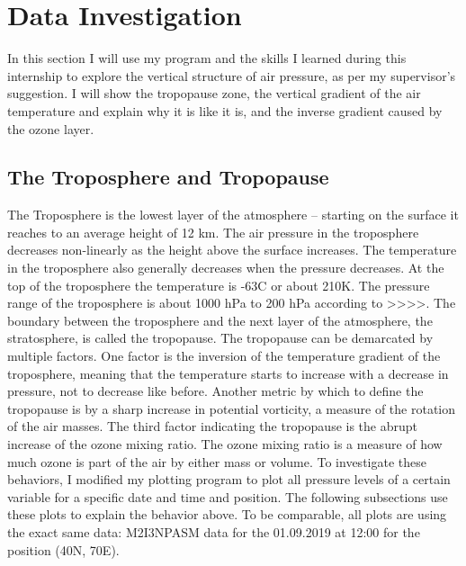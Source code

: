 \documentclass[../00_main.tex]{subfiles}
\begin{document}
\section{Data Investigation}

In this section I will use my program and the skills I learned during this
internship to explore the vertical structure of air pressure, as per my
supervisor's suggestion. I will show the tropopause zone, the vertical gradient
of the air temperature and explain why it is like it is, and the inverse
gradient caused by the ozone layer.

\subsection{The Troposphere and Tropopause}

The Troposphere is the lowest layer of the atmosphere -- starting on the surface
it reaches to an average height of 12 km.
The air pressure in the troposphere decreases non-linearly as the height above 
the surface increases.
The temperature in the troposphere also generally decreases when the pressure
decreases. At the top of the troposphere the temperature is -63\textdegree{}C
or about 210K. 
The pressure range of the troposphere is about 1000 hPa to 200 hPa according to >>>>.\newline
The boundary between the troposphere and the next layer of the atmosphere,
the stratosphere, is called the tropopause. The tropopause can be demarcated
by multiple factors. One factor is the inversion of the temperature gradient of
the troposphere, meaning that the temperature starts to increase with
a decrease in pressure, not to decrease like before.
Another metric by which to define the tropopause is by a sharp increase in
potential vorticity, a measure of the rotation of the air masses. 
The third factor indicating the tropopause is the abrupt increase of the ozone
mixing ratio. The ozone mixing ratio is a measure of how much ozone is part of
the air by either mass or volume.\newline
To investigate these behaviors, I modified my plotting program to plot all
pressure levels of a certain variable for a specific date and time and
position. The following subsections use these plots to explain the behavior
above. To be comparable, all plots are using the exact same data: M2I3NPASM
data for the 01.09.2019 at 12:00 for the position (40\textdegree{}N,
70\textdegree{}E).
\end{document}
